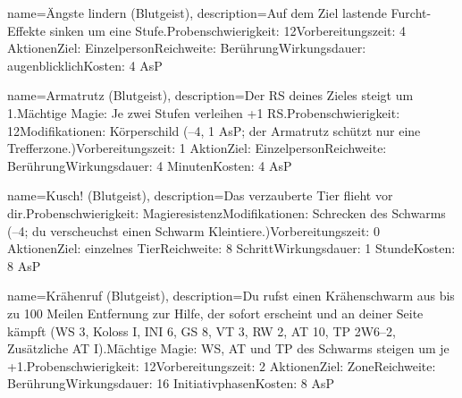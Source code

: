{
    name={Ängste lindern (Blutgeist)},
    description={Auf dem Ziel lastende Furcht-Effekte sinken um eine Stufe.\newline Probenschwierigkeit: 12\newline Vorbereitungszeit: 4 Aktionen\newline Ziel: Einzelperson\newline Reichweite: Berührung\newline Wirkungsdauer: augenblicklich\newline Kosten: 4 AsP}
}


{
    name={Armatrutz (Blutgeist)},
    description={Der RS deines Zieles steigt um 1.\newline Mächtige Magie: Je zwei Stufen verleihen +1 RS.\newline Probenschwierigkeit: 12\newline Modifikationen: Körperschild (–4, 1 AsP; der Armatrutz schützt nur eine Trefferzone.)\newline Vorbereitungszeit: 1 Aktion\newline Ziel: Einzelperson\newline Reichweite: Berührung\newline Wirkungsdauer: 4 Minuten\newline Kosten: 4 AsP}
}


{
    name={Kusch! (Blutgeist)},
    description={Das verzauberte Tier flieht vor dir.\newline Probenschwierigkeit: Magieresistenz\newline Modifikationen: Schrecken des Schwarms (–4; du verscheuchst einen Schwarm Kleintiere.)\newline Vorbereitungszeit: 0 Aktionen\newline Ziel: einzelnes Tier\newline Reichweite: 8 Schritt\newline Wirkungsdauer: 1 Stunde\newline Kosten: 8 AsP}
}


{
    name={Krähenruf  (Blutgeist)},
    description={Du rufst einen Krähenschwarm aus bis zu 100 Meilen Entfernung zur Hilfe, der sofort erscheint und an deiner Seite kämpft (WS 3, Koloss I, INI 6, GS 8, VT 3, RW 2, AT 10, TP 2W6–2, Zusätzliche AT I).\newline Mächtige Magie: WS, AT und TP des Schwarms steigen um je +1.\newline Probenschwierigkeit: 12\newline Vorbereitungszeit: 2 Aktionen\newline Ziel: Zone\newline Reichweite: Berührung\newline Wirkungsdauer: 16 Initiativphasen\newline Kosten: 8 AsP}
}


